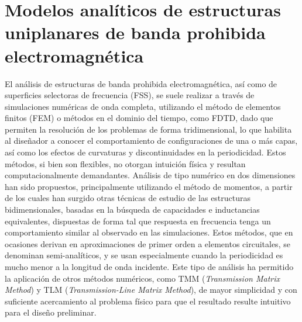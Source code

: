 \section{Modelos analíticos de estructuras uniplanares de banda prohibida electromagnética}
\label{sec:modelo_analitico}




El análisis de estructuras de banda prohibida electromagnética, así como de superficies selectoras de frecuencia (FSS), se suele realizar a través de simulaciones numéricas de onda completa, utilizando el método de elementos finitos (FEM) o métodos en el dominio del tiempo, como FDTD, dado que permiten la resolución de los problemas de forma tridimensional, lo que habilita al diseñador a conocer el comportamiento de configuraciones de una o más capas, así como los efectos de curvaturas y discontinuidades en la periodicidad. Estos métodos, si bien son flexibles, no otorgan intuición física y resultan computacionalmente demandantes. Análisis de tipo numérico en dos dimensiones han sido propuestos, principalmente utilizando el método de momentos, a partir de los cuales han surgido otras técnicas de estudio de las estructuras bidimensionales, basadas en la búsqueda de capacidades e inductancias equivalentes, dispuestas de forma tal que respuesta en frecuencia tenga un comportamiento similar al observado en las simulaciones. Estos métodos, que en ocasiones derivan en aproximaciones de primer orden a elementos circuitales, se denominan semi-analíticos, y se usan especialmente cuando la periodicidad es mucho menor a la longitud de onda incidente. Este tipo de análisis ha permitido la aplicación de otros métodos numéricos, como TMM (\textit{Transmission Matrix Method}) y TLM (\textit{Transmission-Line Matrix Method}), de mayor simplicidad y con suficiente acercamiento al problema físico para que el resultado resulte intuitivo para el diseño preliminar.

